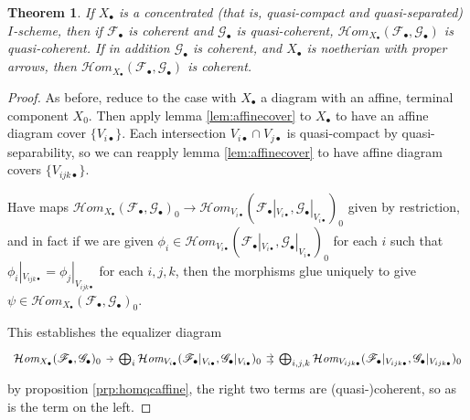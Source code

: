 \documentclass[proquest]{uwthesis}[2014/11/13]
\newtheorem{theorem}{Theorem}[section]
\theoremstyle{definition}
\newcommand{\cHom}{\mathcal{H} \textit{om}}
\newcommand{\FF}{\mathscr{F}}
\newcommand{\GG}{\mathscr{G}}
\begin{document}
\begin{theorem}
	If $X_\bullet$ is a concentrated (that is, quasi-compact and quasi-separated) $I$-scheme, then if $\FF_\bullet$ is coherent and $\GG_\bullet$ is quasi-coherent, $\cHom_{X_\bullet}(\FF_\bullet, \GG_\bullet)$ is quasi-coherent.
	If in addition $\GG_\bullet$ is coherent, and $X_\bullet$ is noetherian with proper arrows, then $\cHom_{X_\bullet}(\FF_\bullet, \GG_\bullet)$ is coherent.
\end{theorem}
\begin{proof}
	As before, reduce to the case with $X_\bullet$ a diagram with an affine, terminal component $X_0$.
	Then apply lemma \ref{lem:affinecover} to $X_\bullet$ to have an affine diagram cover $\{V_{i\bullet}\}$.
	Each intersection $V_{i \bullet} \cap V_{j \bullet}$ is quasi-compact by quasi-separability, so we can reapply lemma \ref{lem:affinecover} to have affine diagram covers $\{V_{ijk\bullet}\}$.
	
	Have maps $\cHom_{X_\bullet}(\FF_\bullet, \GG_\bullet)_0 \rightarrow \cHom_{V_{i\bullet}}(\FF_\bullet |_{V_{i\bullet}}, \GG_\bullet |_{V_{i \bullet}})_0$ given by restriction, and in fact if we are given $\phi_i \in \cHom_{V_{i\bullet}}(\FF_\bullet |_{V_{i\bullet}}, \GG_\bullet |_{V_{i \bullet}})_0$ for each $i$ such that $\phi_i |_{V_{ijk \bullet}} = \phi_j |_{V_{ijk \bullet}}$ for each $i, j, k$, then the morphisms glue uniquely to give $\psi \in \cHom_{X_\bullet}(\FF_\bullet, \GG_\bullet)_0$.
	
	This establishes the equalizer diagram
	\[
	\begin{tikzcd}[column sep=tiny]
		\cHom_{X_\bullet}(\FF_\bullet, \GG_\bullet)_0 \arrow{r} & \bigoplus_i \cHom_{V_{i\bullet}}(\FF_\bullet |_{V_{i\bullet}}, \GG_\bullet |_{V_{i \bullet}})_0 \arrow[yshift=.5ex]{r} \arrow[yshift=-.5ex]{r} & \bigoplus_{i,j,k} \cHom_{V_{ijk\bullet}}(\FF_\bullet |_{V_{ijk\bullet}}, \GG_\bullet |_{V_{ijk \bullet}})_0
	\end{tikzcd}
	\]
	by proposition \ref{prp:homqcaffine}, the right two terms are (quasi-)coherent, so as is the term on the left.
\end{proof}
\end{document}
